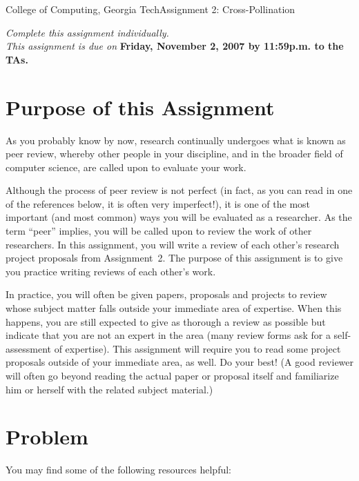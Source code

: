 \documentclass[11pt]{article}
\begin{document}


{College of Computing, Georgia Tech}{Assignment 2: Cross-Pollination}

{\em Complete this assignment individually. \\  This
  assignment is due on} {\bf Friday, November 2, 2007 by 11:59p.m. to
  the TAs.}

\section{Purpose of this Assignment}



As you probably know by now, research continually undergoes what is
known as peer review, whereby other people in your discipline, and in
the broader field of computer science, are called upon to evaluate your
work.  

Although the process of peer review is not perfect (in fact, as you can
read in one of the references below, it is often very imperfect!), it is
one of the most important (and most common) ways you will be evaluated
as a researcher.  As the term ``peer'' implies, you will be called upon
to review the work of other researchers.  In this assignment, you will
write a review of each other's research project proposals from
Assignment~2.  The purpose of this assignment is to give you practice
writing reviews of each other's work.

In practice, you will often be given papers, proposals and projects to
review whose subject matter falls outside your immediate area of
expertise.  When this happens, you are still expected to give as
thorough a review as possible but indicate that you are not an expert in
the area (many review forms ask for a self-assessment of expertise).
This assignment will require you to read some project proposals outside
of your immediate area, as well.  Do your best!  (A good reviewer will
often go beyond reading the actual paper or proposal itself and
familiarize him or herself with the related subject material.)

\section{Problem}



You may find some of the following resources helpful:
\end{document}
